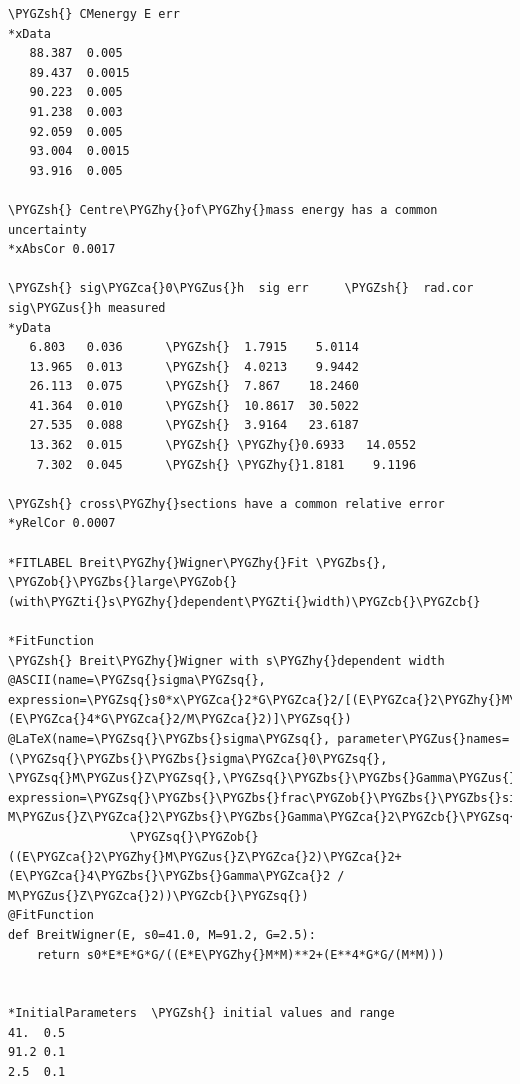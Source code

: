 \documentclass[a4paper,10pt,english]{sphinxmanual}
\def\PYGZbs{\char`\\}
\def\PYGZus{\char`\_}
\def\PYGZob{\char`\{}
\def\PYGZcb{\char`\}}
\def\PYGZca{\char`\^}
\def\PYGZsh{\char`\#}
\def\PYGZhy{\char`\-}
\def\PYGZsq{\char`\'}
\def\PYGZti{\char`\~}
\renewcommand\PYGZsq{\textquotesingle}
\begin{document}
\begin{Verbatim}[commandchars=\\\{\}]
\PYGZsh{} CMenergy E err
*xData
   88.387  0.005
   89.437  0.0015
   90.223  0.005
   91.238  0.003
   92.059  0.005
   93.004  0.0015
   93.916  0.005

\PYGZsh{} Centre\PYGZhy{}of\PYGZhy{}mass energy has a common uncertainty
*xAbsCor 0.0017

\PYGZsh{} sig\PYGZca{}0\PYGZus{}h  sig err     \PYGZsh{}  rad.cor  sig\PYGZus{}h measured
*yData
   6.803   0.036      \PYGZsh{}  1.7915    5.0114
   13.965  0.013      \PYGZsh{}  4.0213    9.9442
   26.113  0.075      \PYGZsh{}  7.867    18.2460
   41.364  0.010      \PYGZsh{}  10.8617  30.5022
   27.535  0.088      \PYGZsh{}  3.9164   23.6187
   13.362  0.015      \PYGZsh{} \PYGZhy{}0.6933   14.0552
    7.302  0.045      \PYGZsh{} \PYGZhy{}1.8181    9.1196

\PYGZsh{} cross\PYGZhy{}sections have a common relative error
*yRelCor 0.0007

*FITLABEL Breit\PYGZhy{}Wigner\PYGZhy{}Fit \PYGZbs{}, \PYGZob{}\PYGZbs{}large\PYGZob{}(with\PYGZti{}s\PYGZhy{}dependent\PYGZti{}width)\PYGZcb{}\PYGZcb{}

*FitFunction
\PYGZsh{} Breit\PYGZhy{}Wigner with s\PYGZhy{}dependent width
@ASCII(name=\PYGZsq{}sigma\PYGZsq{}, expression=\PYGZsq{}s0*x\PYGZca{}2*G\PYGZca{}2/[(E\PYGZca{}2\PYGZhy{}M\PYGZca{}2)\PYGZca{}2+(E\PYGZca{}4*G\PYGZca{}2/M\PYGZca{}2)]\PYGZsq{})
@LaTeX(name=\PYGZsq{}\PYGZbs{}sigma\PYGZsq{}, parameter\PYGZus{}names=(\PYGZsq{}\PYGZbs{}\PYGZbs{}sigma\PYGZca{}0\PYGZsq{}, \PYGZsq{}M\PYGZus{}Z\PYGZsq{},\PYGZsq{}\PYGZbs{}\PYGZbs{}Gamma\PYGZus{}Z\PYGZsq{}),
expression=\PYGZsq{}\PYGZbs{}\PYGZbs{}frac\PYGZob{}\PYGZbs{}\PYGZbs{}sigma\PYGZca{}0\PYGZbs{}\PYGZbs{}, M\PYGZus{}Z\PYGZca{}2\PYGZbs{}\PYGZbs{}Gamma\PYGZca{}2\PYGZcb{}\PYGZsq{}
                 \PYGZsq{}\PYGZob{}((E\PYGZca{}2\PYGZhy{}M\PYGZus{}Z\PYGZca{}2)\PYGZca{}2+(E\PYGZca{}4\PYGZbs{}\PYGZbs{}Gamma\PYGZca{}2 / M\PYGZus{}Z\PYGZca{}2))\PYGZcb{}\PYGZsq{})
@FitFunction
def BreitWigner(E, s0=41.0, M=91.2, G=2.5):
    return s0*E*E*G*G/((E*E\PYGZhy{}M*M)**2+(E**4*G*G/(M*M)))


*InitialParameters  \PYGZsh{} initial values and range
41.  0.5
91.2 0.1
2.5  0.1


\end{Verbatim}
\end{document}
